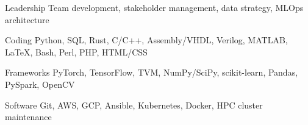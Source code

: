 

\begin{cvskills}

  \cvskill
    {Leadership} %
    {Team development, stakeholder management, data strategy, MLOps architecture} %

  \cvskill
    {Coding} %
    {Python, SQL, Rust, C/C++, Assembly/VHDL, Verilog, MATLAB\textregistered, LaTeX, Bash, Perl, PHP, HTML/CSS} %

  \cvskill
    {Frameworks} %
    {PyTorch, TensorFlow, TVM, NumPy/SciPy, scikit-learn, Pandas, PySpark, OpenCV} %
    
  \cvskill
    {Software} %
    {Git, AWS, GCP, Ansible, Kubernetes, Docker, HPC cluster maintenance} %


\end{cvskills}
